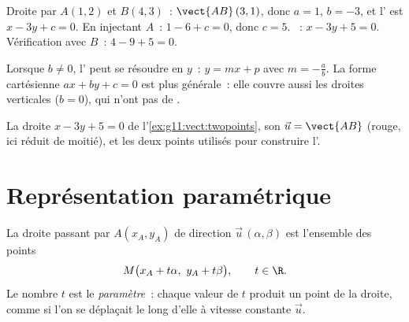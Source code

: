\begin{example}\label{ex:g11:vect:twopoints}
Droite par $A(1, 2)$ et $B(4, 3)$~: $\vect{AB}\,(3, 1)$, donc $a = 1$,
$b = -3$, et l' est $x - 3y + c = 0$. En injectant $A$~:
$1 - 6 + c = 0$, donc $c = 5$. ~: $x - 3y + 5 = 0$. Vérification
avec $B$~: $4 - 9 + 5 = 0$.
\end{example}

\begin{remark}
Lorsque $b \neq 0$, l' peut se résoudre en $y$~:
$y = mx + p$ avec  $m = -\frac ab$. La forme
cartésienne $ax + by + c = 0$ est plus générale~: elle couvre aussi les
droites verticales ($b = 0$), qui n'ont pas de .
\end{remark}

\begin{omfigure}

{\small La droite $x - 3y + 5 = 0$ de l'\cref{ex:g11:vect:twopoints}, son
 $\vec u = \vect{AB}$ (rouge, ici réduit de moitié), et
les deux points utilisés pour construire l'.}
\end{omfigure}

\section{Représentation paramétrique}

\begin{definition}\label{def:g11:vect:parametric}
La droite passant par $A(x_A, y_A)$ de direction $\vec u\,(\alpha, \beta)$
est l'ensemble des points
\[
M\bigl(x_A + t\alpha,\ y_A + t\beta\bigr), \qquad t \in \R .
\]
Le nombre $t$ est le \emph{paramètre}~: chaque valeur de $t$ produit un
point de la droite, comme si l'on se déplaçait le long d'elle à vitesse
constante $\vec u$.
\end{definition}

